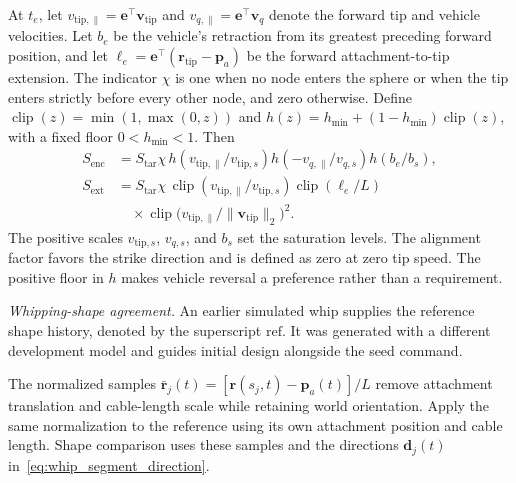 At $t_e$, let $v_{\mathrm{tip},\parallel}=\mathbf e^\top\mathbf v_{\mathrm{tip}}$
and $v_{q,\parallel}=\mathbf e^\top\mathbf v_q$ denote the forward
tip and vehicle velocities. Let $b_e$ be the vehicle's retraction
from its greatest preceding forward position, and let
$\ell_e=\mathbf e^\top(\mathbf r_{\mathrm{tip}}-\mathbf p_a)$
be the forward attachment-to-tip extension. The indicator $\chi$
is one when no node enters the sphere or when the tip enters
strictly before every other node, and zero otherwise.
Define $\operatorname{clip}(z)=\min(1,\max(0,z))$ and
$h(z)=h_{\min}+(1-h_{\min})\operatorname{clip}(z)$, with a fixed
floor $0<h_{\min}<1$. Then
\begin{equation}
\begin{aligned}
S_{\mathrm{enc}}
&=S_{\mathrm{tar}}\chi\,h(v_{\mathrm{tip},\parallel}/v_{\mathrm{tip},s})
h(-v_{q,\parallel}/v_{q,s})h(b_e/b_s),\\
S_{\mathrm{ext}}
&=S_{\mathrm{tar}}\chi\,\operatorname{clip}(v_{\mathrm{tip},\parallel}/v_{\mathrm{tip},s})
\operatorname{clip}(\ell_e/L)\\
&\quad\times\operatorname{clip}\!\bigl(
v_{\mathrm{tip},\parallel}/\|\mathbf v_{\mathrm{tip}}\|_2\bigr)^2.
\end{aligned}
\label{eq:directed_motion_scores}
\end{equation}
The positive scales $v_{\mathrm{tip},s}$, $v_{q,s}$, and $b_s$
set the saturation levels. The alignment factor favors the strike
direction and is defined as zero at zero tip speed. The positive
floor in $h$ makes vehicle reversal a preference rather than a
requirement.

\noindent\emph{Whipping-shape agreement.}
An earlier simulated whip supplies the reference shape history,
denoted by the superscript $\mathrm{ref}$. It was generated with a
different development model and guides initial design alongside
the seed command.

The normalized samples
$\bar{\mathbf r}_j(t)=[\mathbf r(s_j,t)-\mathbf p_a(t)]/L$
remove attachment translation and cable-length scale while
retaining world orientation. Apply the same normalization to the
reference using its own attachment position and cable length.
Shape comparison uses these samples and the directions
$\mathbf d_j(t)$ in~\eqref{eq:whip_segment_direction}.

